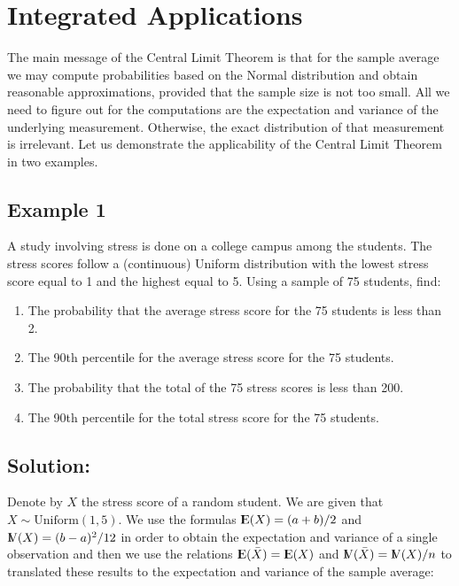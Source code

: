 \documentclass[]{krantz}
\newcommand{\Expec}{{\rm I\kern-.3em E}}
\newcommand{\Var}{{\rm I\kern-.3em V}}
\theoremstyle{definition}
\theoremstyle{definition}
\theoremstyle{definition}
\theoremstyle{remark}
\begin{document}
\section{Integrated Applications}\label{integrated-applications}

The main message of the Central Limit Theorem is that for the sample
average we may compute probabilities based on the Normal distribution
and obtain reasonable approximations, provided that the sample size is
not too small. All we need to figure out for the computations are the
expectation and variance of the underlying measurement. Otherwise, the
exact distribution of that measurement is irrelevant. Let us demonstrate
the applicability of the Central Limit Theorem in two examples.

\subsection{Example 1}\label{example-1}

A study involving stress is done on a college campus among the students.
The stress scores follow a (continuous) Uniform distribution with the
lowest stress score equal to 1 and the highest equal to 5. Using a
sample of 75 students, find:

\begin{enumerate}
\def\labelenumi{\arabic{enumi}.}
\item
  The probability that the average stress score for the 75 students is
  less than 2.
\item
  The 90th percentile for the average stress score for the 75 students.
\item
  The probability that the total of the 75 stress scores is less than
  200.
\item
  The 90th percentile for the total stress score for the 75 students.
\end{enumerate}

\subsection*{Solution:}\label{solution}


Denote by \(X\) the stress score of a random student. We are given that
\(X \sim \mathrm{Uniform}(1,5)\). We use the formulas
\(\Expec(X) = (a+b)/2\) and \(\Var(X) = (b-a)^2/12\) in order to obtain
the expectation and variance of a single observation and then we use the
relations \(\Expec(\bar X) = \Expec(X)\) and
\(\Var(\bar X) = \Var(X)/n\) to translated these results to the
expectation and variance of the sample average:
\end{document}
